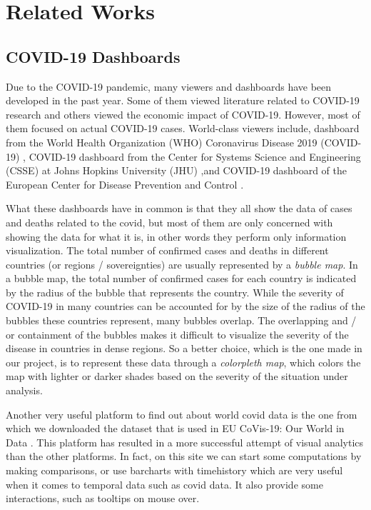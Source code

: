 \documentclass[10pt,conference]{IEEEtran}
\begin{document}
\smallbreak

\section{Related Works}

\subsection{COVID-19 Dashboards}
Due to the COVID-19 pandemic, many viewers and dashboards have been developed in the past year. Some of them \cite{vis1, vis2, vis3} 
viewed literature related to COVID-19 research and others \cite{vis4} viewed the economic impact of COVID-19. 
However, most of them \cite{vis5} focused on actual COVID-19 cases. World-class viewers include, dashboard from the World Health 
Organization (WHO) Coronavirus Disease 2019 (COVID-19) \cite{vis6}, COVID-19 dashboard from the Center for Systems Science and Engineering 
(CSSE) at Johns Hopkins University (JHU) \cite{vis7},and COVID-19 dashboard of the European Center for Disease Prevention and Control \cite{vis8}.

What these dashboards have in common is that they all show the data of cases and deaths related to the covid, but most of them are only 
concerned with showing the data for what it is, in other words they perform only information visualization.
The total number of confirmed cases and deaths in different countries (or regions / sovereignties) are usually represented by a {\em bubble map}. 
In a bubble map, the total number of confirmed cases for each country is indicated by the radius of the bubble that represents the country. 
While the severity of COVID-19 in many countries can be accounted for by the size of the radius of the bubbles these countries represent, 
many bubbles overlap. The overlapping and / or containment of the bubbles makes it difficult to visualize the severity of the disease 
in countries in dense regions.
So a better choice, which is the one made in our project, is to represent these data through a {\em colorpleth map}, which colors the 
map with lighter or darker shades based on the severity of the situation under analysis.

Another very useful platform to find out about world covid data is the one from which we downloaded the dataset that is used in 
EU CoVis-19: Our World in Data \cite{vis9}. This platform has resulted in a more successful attempt of visual analytics than the other platforms. 
In fact, on this site we can start some computations by making comparisons, or use barcharts with timehistory which are very useful 
when it comes to temporal data such as covid data. It also provide some interactions, such as tooltips on mouse over. 
\end{document}
